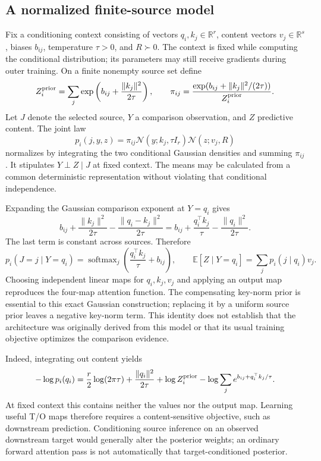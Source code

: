 \documentclass[11pt,letterpaper]{article}
\newcommand{\R}{\mathbb R}
\newcommand{\E}{\mathbb E}
\newcommand{\softmax}{\operatorname{softmax}}
\begin{document}
\subsection{A normalized finite-source model}
Fix a conditioning context consisting of vectors $q_i,k_j\in\R^r$, content vectors $v_j\in\R^s$, biases $b_{ij}$, temperature $\tau>0$, and $R\succ0$. The context is fixed while computing the conditional distribution; its parameters may still receive gradients during outer training. On a finite nonempty source set define
\begin{equation}
 Z_i^{\rm prior}=\sum_j\exp\left(b_{ij}+\frac{\|k_j\|^2}{2\tau}\right),\qquad
 \pi_{ij}=\frac{\exp(b_{ij}+\|k_j\|^2/(2\tau))}{Z_i^{\rm prior}}.
\end{equation}
Let $J$ denote the selected source, $Y$ a comparison observation, and $Z$ predictive content. The joint law
\begin{equation}
 p_i(j,y,z)=\pi_{ij}\mathcal N(y;k_j,\tau I_r)\mathcal N(z;v_j,R)
 \label{eq:joint}
\end{equation}
normalizes by integrating the two conditional Gaussian densities and summing $\pi_{ij}$. It stipulates $Y\perp Z\mid J$ at fixed context. The means may be calculated from a common deterministic representation without violating that conditional independence.

Expanding the Gaussian comparison exponent at $Y=q_i$ gives
\begin{equation}
 b_{ij}+\frac{\|k_j\|^2}{2\tau}
 -\frac{\|q_i-k_j\|^2}{2\tau}
 =b_{ij}+\frac{q_i^\top k_j}{\tau}-\frac{\|q_i\|^2}{2\tau}.
\end{equation}
The last term is constant across sources. Therefore
\begin{equation}
 p_i(J=j\mid Y=q_i)=\softmax_j\left(\frac{q_i^\top k_j}{\tau}+b_{ij}\right),\qquad
 \E[Z\mid Y=q_i]=\sum_j p_i(j\mid q_i)v_j.
 \label{eq:exactattention}
\end{equation}
Choosing independent linear maps for $q_i,k_j,v_j$ and applying an output map reproduces the four-map attention function. The compensating key-norm prior is essential to this exact Gaussian construction; replacing it by a uniform source prior leaves a negative key-norm term. This identity does not establish that the architecture was originally derived from this model or that its usual training objective optimizes the comparison evidence.

Indeed, integrating out content yields
\begin{equation}
 -\log p_i(q_i)=\frac r2\log(2\pi\tau)+\frac{\|q_i\|^2}{2\tau}
 +\log Z_i^{\rm prior}-\log\sum_j e^{b_{ij}+q_i^\top k_j/\tau}.
\end{equation}
At fixed context this contains neither the values nor the output map. Learning useful T/O maps therefore requires a content-sensitive objective, such as downstream prediction. Conditioning source inference on an observed downstream target would generally alter the posterior weights; an ordinary forward attention pass is not automatically that target-conditioned posterior.
\end{document}
